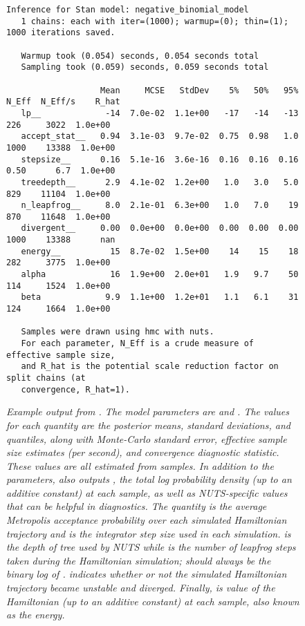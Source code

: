 \begin{figure}
\begin{Verbatim}[fontsize=\footnotesize]
   Inference for Stan model: negative_binomial_model
   1 chains: each with iter=(1000); warmup=(0); thin=(1); 1000 iterations saved.

   Warmup took (0.054) seconds, 0.054 seconds total
   Sampling took (0.059) seconds, 0.059 seconds total

                   Mean     MCSE   StdDev    5%   50%   95%  N_Eff  N_Eff/s    R_hat
   lp__             -14  7.0e-02  1.1e+00   -17   -14   -13    226     3022  1.0e+00
   accept_stat__   0.94  3.1e-03  9.7e-02  0.75  0.98   1.0   1000    13388  1.0e+00
   stepsize__      0.16  5.1e-16  3.6e-16  0.16  0.16  0.16   0.50      6.7  1.0e+00
   treedepth__      2.9  4.1e-02  1.2e+00   1.0   3.0   5.0    829    11104  1.0e+00
   n_leapfrog__     8.0  2.1e-01  6.3e+00   1.0   7.0    19    870    11648  1.0e+00
   divergent__     0.00  0.0e+00  0.0e+00  0.00  0.00  0.00   1000    13388      nan
   energy__          15  8.7e-02  1.5e+00    14    15    18    282     3775  1.0e+00
   alpha             16  1.9e+00  2.0e+01   1.9   9.7    50    114     1524  1.0e+00
   beta             9.9  1.1e+00  1.2e+01   1.1   6.1    31    124     1664  1.0e+00

   Samples were drawn using hmc with nuts.
   For each parameter, N_Eff is a crude measure of effective sample size,
   and R_hat is the potential scale reduction factor on split chains (at 
   convergence, R_hat=1).
\end{Verbatim}
\vspace*{-6pt}
\caption{\small\it Example output from .  The model
  parameters are  and .  The values for each
  quantity are the posterior means, standard deviations, and
  quantiles, along with Monte-Carlo standard error, effective sample
  size estimates (per second), and convergence diagnostic statistic.
  These values are all estimated from samples. In addition to the
  parameters,  also outputs , 
  the total log probability density (up to an additive constant) at each sample,
  as well as NUTS-specific values that can be helpful in diagnostics. 
  The quantity  is the average Metropolis acceptance 
  probability over each simulated Hamiltonian trajectory and  
  is the integrator step size used in each simulation.   is the 
  depth of tree used by NUTS while  is the number of leapfrog 
  steps taken during the Hamiltonian simulation;  should always
  be the binary log of .   indicates
  whether or not the simulated Hamiltonian trajectory became unstable and
  diverged.  Finally,  is value of the Hamiltonian (up to an additive
  constant) at each sample, also known as the energy.
  }
\label{bin-stansummary-eg.figure}
\end{figure}

